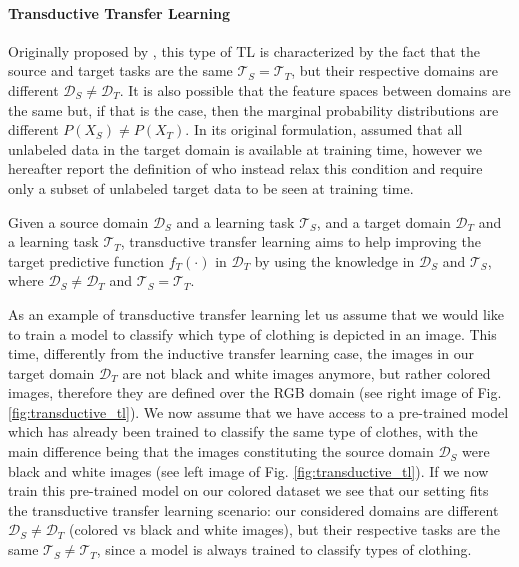 \paragraph{Transductive Transfer Learning}
Originally proposed by \citet{arnold2007comparative}, this type of TL is characterized by the fact that the source and target tasks are the same $\mathcal{T}_S = \mathcal{T}_T$, but their respective domains are different $\mathcal{D}_S \neq \mathcal{D}_T$. It is also possible that the feature spaces between domains are the same but, if that is the case, then the marginal probability distributions are different $P(X_S)\neq P(X_T)$. In its original formulation, \citet{arnold2007comparative} assumed that all unlabeled data in the target domain is available at training time, however we hereafter report the definition of \citet{pan2009survey} who instead relax this condition and require only a subset of unlabeled target data to be seen at training time.
\begin{definition}
	Given a source domain $\mathcal{D}_S$ and a learning task $\mathcal{T}_S$, and a target domain $\mathcal{D}_T$ and a learning task $\mathcal{T}_T$, transductive transfer learning aims to help improving the target predictive function $f_T(\cdot)$ in $\mathcal{D}_T$ by using the knowledge in $\mathcal{D}_S$ and $\mathcal{T}_S$, where $\mathcal{D}_S \neq \mathcal{D}_T$ and $\mathcal{T}_S = \mathcal{T}_T$. 
\end{definition}
As an example of transductive transfer learning let us assume that we would like to train a model to classify which type of clothing is depicted in an image. This time, differently from the inductive transfer learning case, the images in our target domain $\mathcal{D}_T$ are not black and white images anymore, but rather colored images, therefore they are defined over the RGB domain (see right image of Fig. \ref{fig:transductive_tl}). We now assume that we have access to a pre-trained model which has already been trained to classify the same type of clothes, with the main difference being that the images constituting the source domain $\mathcal{D}_S$ were black and white images (see left image of Fig. \ref{fig:transductive_tl}). If we now train this pre-trained model on our colored dataset we see that our setting fits the transductive transfer learning scenario: our considered domains are different $\mathcal{D}_S \neq \mathcal{D}_T$ (colored vs black and white images), but their respective tasks are the same  $\mathcal{T}_S \neq \mathcal{T}_T$, since a model is always trained to classify types of clothing.

